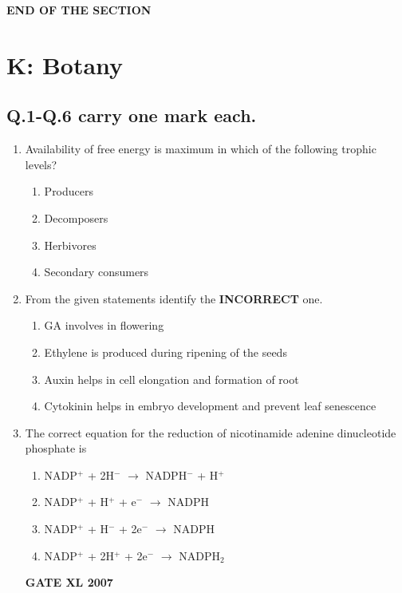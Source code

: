 \documentclass[journal,12pt,onecolumn]{IEEEtran}
\begin{document}
\begin{center}
\textbf{END OF THE SECTION}
\end{center}

\newpage

\section*{K: Botany}
\subsection*{Q.1-Q.6 carry one mark each.}
\begin{enumerate}
    \item Availability of free energy is maximum in which of the following trophic levels?
    \begin{enumerate}
        \item Producers
        \item Decomposers
        \item Herbivores
        \item Secondary consumers
    \end{enumerate}

    \item From the given statements identify the \textbf{INCORRECT} one.
    \begin{enumerate}
        \item GA involves in flowering
        \item Ethylene is produced during ripening of the seeds
        \item Auxin helps in cell elongation and formation of root
        \item Cytokinin helps in embryo development and prevent leaf senescence
    \end{enumerate}

    \item The correct equation for the reduction of nicotinamide adenine dinucleotide phosphate is
    \begin{enumerate}
        \item NADP$^+$ + 2H$^-$ $\rightarrow$ NADPH$^-$ + H$^+$
        \item NADP$^+$ + H$^+$ + e$^-$ $\rightarrow$ NADPH
        \item NADP$^+$ + H$^-$ + 2e$^-$ $\rightarrow$ NADPH
        \item NADP$^+$ + 2H$^+$ + 2e$^-$ $\rightarrow$ NADPH$_2$
    \end{enumerate}\hfill{\textbf{GATE XL 2007}}


\end{enumerate}
\end{document}
